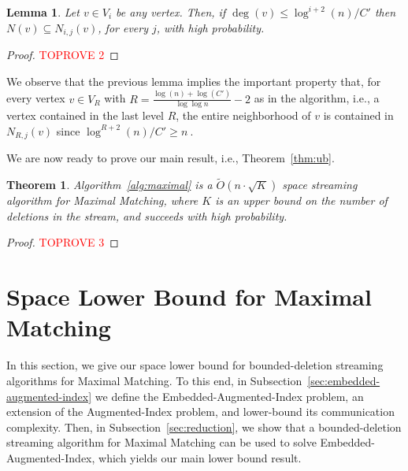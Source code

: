 \documentclass[11pt,a4paper]{article}
\newtheorem{theorem}{Theorem}
\newtheorem{lemma}{Lemma}
\begin{document}
\begin{lemma} \label{lem:technical-1}
 Let $v \in V_i$ be any vertex. Then, if $\deg(v) \le \log^{i+2}(n)/C'$ then $N(v) \subseteq N_{i,j}(v)$, for every $j$, with high probability.
\end{lemma}
\begin{proof}\textcolor{red}{TOPROVE 2}\end{proof}


We observe that the previous lemma implies the important property that, for every vertex $v \in V_{R}$ with $R = \frac{\log(n) + \log(C')}{\log \log n} - 2$ as in the algorithm, i.e., a vertex contained in the last level $R$, the entire neighborhood of $v$ is contained in $N_{R,j}(v)$ since
$\log^{R+2}(n) / C' \ge n \ . $


We are now ready to prove our main result, i.e., Theorem~\ref{thm:ub}.


\setcounter{thmsaved}{\value{theorem}}
\setcounter{theorem}{\value{counterUB}}
\addtocounter{theorem}{-1}

\begin{theorem}
 Algorithm~\ref{alg:maximal} is a $\tilde{O}(n \cdot \sqrt{K})$ space streaming algorithm for \textsf{Maximal Matching}, where $K$ is an upper bound on the number of deletions in the stream, and succeeds with high probability.
\end{theorem}
\setcounter{theorem}{\value{thmsaved}} 

\begin{proof}\textcolor{red}{TOPROVE 3}\end{proof}




\section{Space Lower Bound for \textsf{Maximal Matching}} \label{sec:lb}
In this section, we give our space lower bound for bounded-deletion streaming algorithms for \textsf{Maximal Matching}. To this end, in Subsection~\ref{sec:embedded-augmented-index} we define the \textsf{Embedded-Augmented-Index} problem, an extension of the \textsf{Augmented-Index} problem, and lower-bound its  communication complexity. Then, in Subsection~\ref{sec:reduction}, we show that a bounded-deletion streaming algorithm for \textsf{Maximal Matching} can be used to solve \textsf{Embedded-Augmented-Index}, which yields our main lower bound result.
\end{document}
